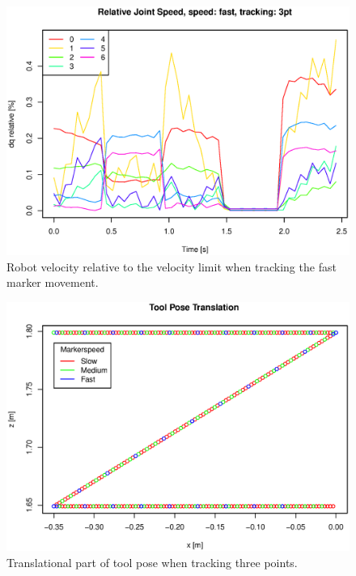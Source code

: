\begin{figure}[H]
\centering
\includegraphics[width= 0.9 \linewidth]{graphics/robotics/relativeConfVel_fast_3pt}
\caption{Robot velocity relative to the velocity limit when tracking the fast marker movement.}
\label{fig:robotspeed_fast_3p}
\end{figure}


\begin{figure}[H]
\centering
\includegraphics[width= 0.9 \linewidth]{graphics/robotics/toolPose_3pt_pos}
\caption{Translational part of tool pose when tracking three points.}
\label{fig:toolpose_3p_pos}
\end{figure}


